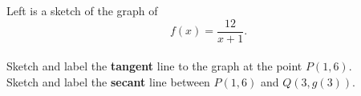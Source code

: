 \documentclass[12pt]{article}
\renewcommand{\emph}[1]{\textsf{\textbf{#1}}}
\begin{document}
\begin{enumerate}
\begin{enumerate}
\begin{multicols}{2}
Left is a sketch of the graph of $$f(x)=\displaystyle{\frac{12}{x+1}}.$$ \\
Sketch and label the \emph{tangent} line to the graph at the point $P(1,6).$\\
Sketch and label the \emph{secant} line between $P(1,6)$ and $Q(3,g(3)).$
\end{multicols}
\end{enumerate}
\end{enumerate}	
\end{document}
